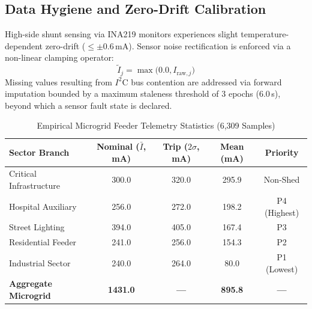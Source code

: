 \documentclass[journal,10pt,twocolumn]{IEEEtran}
\begin{document}
\subsection{Data Hygiene and Zero-Drift Calibration}
High-side shunt sensing via INA219 monitors experiences slight temperature-dependent zero-drift ($\le \pm 0.6$\,mA). Sensor noise rectification is enforced via a non-linear clamping operator:
\begin{equation}
\tilde{I}_j = \max\big(0.0, I_{\text{raw}, j}\big)
\label{eq:clamping}
\end{equation}
Missing values resulting from $I^2$C bus contention are addressed via forward imputation bounded by a maximum staleness threshold of $3$ epochs ($6.0$\,s), beyond which a sensor fault state is declared.

\begin{table}[h]
\centering
\caption{Empirical Microgrid Feeder Telemetry Statistics (6,309 Samples)}
\label{tab:dataset_stats}
\begin{tabular}{@{}lcccc@{}}
\toprule
\textbf{Sector Branch} & \textbf{Nominal ($\bar{I}$, mA)} & \textbf{Trip ($2\sigma$, mA)} & \textbf{Mean (mA)} & \textbf{Priority} \\ \midrule
Critical Infrastructure & 300.0 & 320.0 & 295.9 & Non-Shed \\
Hospital Auxiliary & 256.0 & 272.0 & 198.2 & P4 (Highest) \\
Street Lighting & 394.0 & 405.0 & 167.4 & P3 \\
Residential Feeder & 241.0 & 256.0 & 154.3 & P2 \\
Industrial Sector & 240.0 & 264.0 & 80.0 & P1 (Lowest) \\ \midrule
\textbf{Aggregate Microgrid} & \textbf{1431.0} & \textbf{---} & \textbf{895.8} & \textbf{---} \\ \bottomrule
\end{tabular}
\end{table}
\end{document}
